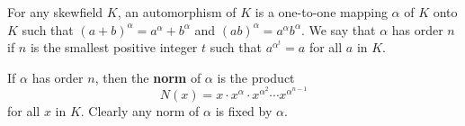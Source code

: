 For any skewfield $K$, an automorphism of $K$ is a one-to-one mapping $\alpha$ of $K$ onto $K$ such that $(a+b)^\alpha = a^\alpha + b^\alpha$ and $(ab)^\alpha = a^\alpha b^\alpha$. We say that $\alpha$ has order $n$ if $n$ is the smallest positive integer $t$ such that $a^{\alpha^t} = a$ for all $a$ in $K$.

If $\alpha$ has order $n$, then the \textbf{norm} of $\alpha$ is the product
$$N(x) = x \cdot x^\alpha \cdot x^{\alpha^2} \cdots x^{\alpha^{n-1}}$$
for all $x$ in $K$. Clearly any norm of $\alpha$ is fixed by $\alpha$.
